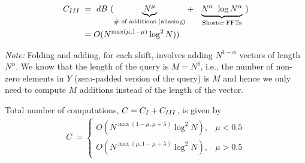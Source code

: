 \begin{enumerate}
	\begin{align*}
	 C_{\RNum{3}} \ &= \  dB ~ 
	( \underset{\text{\# of additions (aliasing)} }{\underbrace{N^{\mu}}} + \ \
	\underset{\text{Shorter FFTs} }{\underbrace{N^{\alpha} \ \log N^{\alpha}}} \ ) \\
	&=  O(N^{\max(\mu,1- \mu)} \log^2 N))
	\end{align*}
	
	
	{\textit{Note:}} Folding and adding, for each shift, involves adding $N^{1-\alpha}$ vectors of length $N^{\alpha}$. We know that the length of the query is $M =N^{\delta}$, i.e., the number of non-zero elements in $Y$ (zero-padded version of the query) is $M$ and hence we only need to compute $M$ additions instead of the length of the vector.
	
\end{enumerate}

Total number of computations, $C = C_{\RNum{1}}+C_{\RNum{3}} $, is given by   
  \begin{align*}
  C \ =
  \begin{cases}
  O(N^{\max(1-\mu, \mu + \lambda) } \log^2 N ), &  	 \mu < 0.5\\
  O(N^{\max(\mu, 1- \mu + \lambda )} \log^2 N ), &  	 \mu > 0.5
  \end{cases}
  \end{align*}
  



